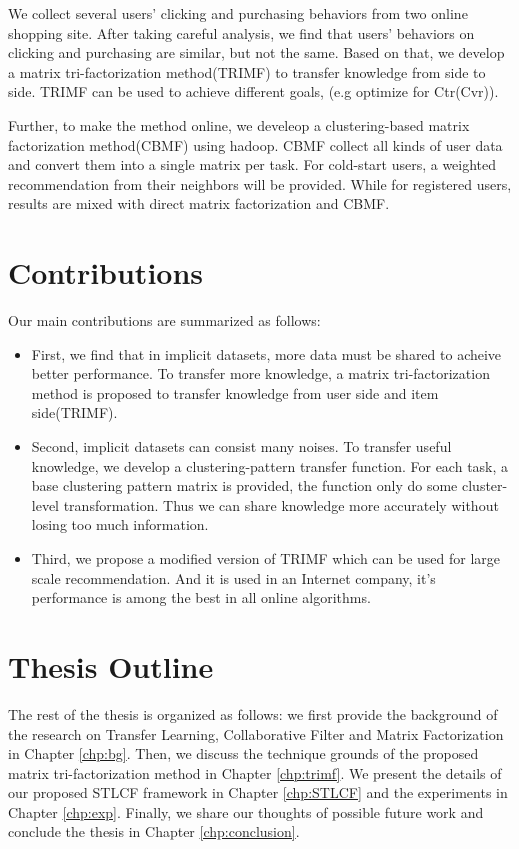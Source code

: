 We collect several users' clicking and purchasing behaviors from two online shopping site. After taking careful analysis, we find that users' behaviors on clicking and purchasing are similar, but not the same. Based on that, we develop a matrix tri-factorization method(TRIMF) to transfer knowledge from side to side. TRIMF can be used to achieve different goals, (e.g optimize for Ctr(Cvr)).

Further, to make the method online, we develeop a clustering-based matrix factorization method(CBMF) using hadoop. CBMF collect all kinds of user data and convert them into a single matrix per task. For cold-start users, a weighted recommendation from their neighbors will be provided. While for registered users, results are mixed with direct matrix factorization and CBMF.

\hspace{0.1in}
\section{Contributions}

Our main contributions are summarized as follows:

\begin{itemize}[noitemsep,topsep=0pt,parsep=0pt,partopsep=0pt]
\item First, we find that in implicit datasets, more data must be shared to acheive better performance. To transfer more knowledge, a matrix tri-factorization method is proposed to transfer knowledge from user side and item side(TRIMF).
\item Second, implicit datasets can consist many noises. To transfer useful knowledge, we develop a clustering-pattern transfer function. For each task, a base clustering pattern matrix is provided, the function only do some cluster-level transformation. Thus we can share knowledge more accurately without losing too much information.
\item Third, we propose a modified version of TRIMF which can be used for large scale recommendation. And it is used in an Internet company, it's performance is among the best in all online algorithms.
\end{itemize}

\hspace{0.1in}
\section{Thesis Outline}

The rest of the thesis is organized as follows: we first provide the background of the research on Transfer Learning, Collaborative Filter and Matrix Factorization in Chapter \ref{chp:bg}. Then, we discuss the technique grounds of the proposed matrix tri-factorization method in Chapter \ref{chp:trimf}. We present the details of our proposed STLCF framework in Chapter \ref{chp:STLCF} and the experiments in Chapter \ref{chp:exp}. Finally, we share our thoughts of possible future work and conclude the thesis in Chapter \ref{chp:conclusion}.



